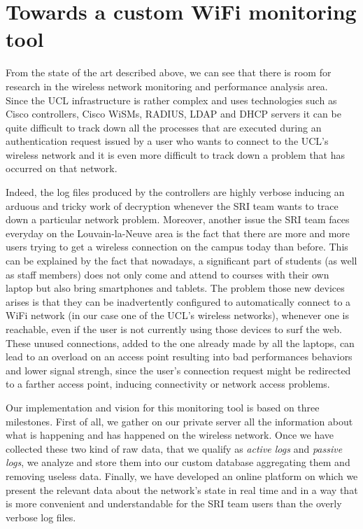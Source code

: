 \section{Towards a custom WiFi monitoring tool}
From the state of the art described above, we can see that there is room for research in the wireless network monitoring and performance analysis area.\\
Since the UCL infrastructure is rather complex and uses technologies such as Cisco controllers, Cisco WiSMs, RADIUS, LDAP and DHCP servers it can be quite difficult to track down all the processes that are executed during an authentication request issued by a user who wants to connect to the UCL's wireless network and it is even more difficult to track down a problem that has occurred on that network.

Indeed, the log files produced by the controllers are highly verbose inducing an arduous and tricky work of decryption whenever the SRI team wants to trace down a particular network problem. Moreover, another issue the SRI team faces everyday on the Louvain-la-Neuve area is the fact that there are more and more users trying to get a wireless connection on the campus today than before. This can be explained by the fact that nowadays, a significant part of students (as well as staff members) does not only come and attend to courses with their own laptop but also bring smartphones and tablets. The problem those new devices arises is that they can be inadvertently configured to automatically connect to a WiFi network (in our case one of the UCL's wireless networks), whenever one is reachable, even if the user is not currently using those devices to surf the web. These unused connections, added to the one already made by all the laptops, can lead to an overload on an access point resulting into bad performances behaviors and lower signal strengh, since the user's connection request might be redirected to a farther access point, inducing connectivity or network access problems.


Our implementation and vision for this monitoring tool is based on three milestones. First of all, we gather on our private server all the information about what is happening and has happened on the wireless network. Once we have collected these two kind of raw data, that we qualify as \textit{active logs} and \textit{passive logs}, we analyze and store them into our custom database aggregating them and removing useless data. Finally, we have developed an online platform on which we present the relevant data about the network's state in real time and in a way that is more convenient and understandable for the SRI team users than the overly verbose log files.

